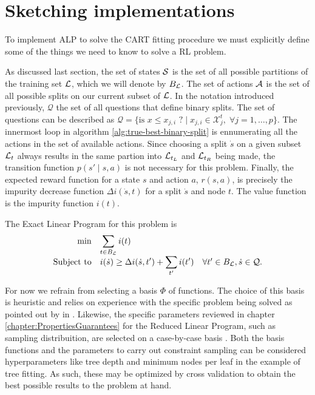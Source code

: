 \section{Sketching implementations}

To implement ALP to solve the CART fitting procedure we must explicitly define
some of the things we need to know to solve a RL problem.

As discussed last section, the set of states $\mathcal{S}$ is the set of all
possible partitions of the training set $\mathcal{L}$, which we will denote by $B_{\mathcal{L}}$.
The set of actions $\mathcal{A}$ is the set of all possible splits on our current
subset of $\mathcal{L}$. In the notation introduced previously, $\mathcal{Q}$ the set of
all questions that define binary splits. The set of questions can be described
as $\mathcal{Q} = \{ \text{is } x \leq x_{j, i} \text{ ?} \mid x_{j, i} \in
\mathcal{X}_{j}^{t}, \; \forall j = 1, \dots, p \}$.  The innermost loop in
algorithm \ref{alg:true-best-binary-split} is ennumerating all the actions in
the set of available actions. Since choosing a split $\dot{s}$ on a given subset
$\mathcal{L}_t$ always results in the same partion into $\mathcal{L}_{t_L}$ and $\mathcal{L}_{t_R}$ being
made, the transition function $p(s' \mid s, a)$ is not necessary for this
problem. Finally, the expected reward function for a state $s$ and action $a$,
$r(s, a)$, is precisely the impurity decrease function $\Delta i(\dot{s}, t)$
for a split $\dot{s}$ and node $t$. The value function is the impurity function
$i(t)$.

The Exact Linear Program for this problem is
\begin{equation}
\begin{array}{rl@{}ll}
    \displaystyle \min & \displaystyle \sum_{t \in B_\L} i(t) \\
    \text{Subject to} & \displaystyle i(\dot{s}) \geq \Delta i(\dot{s}, t') + \sum_{t'} i(t') & \quad \forall t' \in B_\L, \dot{s} \in \mathcal{Q}. \\
\end{array}
\end{equation}


For now we refrain from selecting a basis $\Phi$ of functions. The choice of
this basis is heuristic and relies on experience with the specific problem being
solved as pointed out by \citeauthor{farias2003LP2ADP} in
\cite{farias2003LP2ADP}. Likewise, the specific parameters reviewed in chapter
\ref{chapter:PropertiesGuarantees} for the Reduced Linear Program, such as
sampling distribuition, are selected on a case-by-case basis
\cite{farias2004constraint}. Both the basis functions and the parameters to
carry out constraint sampling can be considered hyperparameters like tree depth
and minimum nodes per leaf in the example of tree fitting. As such, these may be
optimized by cross validation \cite[Ch.~2.1]{intro2statslearning} to obtain the
best possible results to the problem at hand.  


